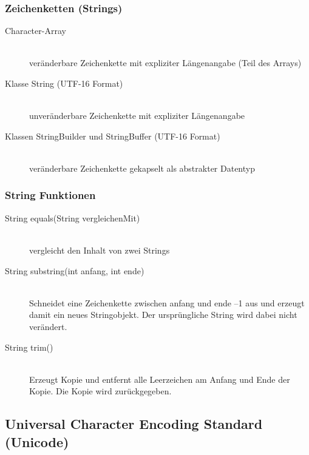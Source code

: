 \documentclass[a4paper,10pt]{article}
\begin{document}
\subsubsection{Zeichenketten (Strings)}
\begin{description}
	\item[Character-Array] \hfill \\
		ver\"anderbare Zeichenkette mit expliziter Längenangabe (Teil des Arrays)
	\item[Klasse String (UTF-16 Format)] \hfill \\
		unver\"anderbare Zeichenkette mit expliziter Längenangabe
	\item[Klassen StringBuilder und StringBuffer (UTF-16 Format)] \hfill \\
		ver\"anderbare Zeichenkette gekapselt als abstrakter Datentyp
\end{description}

\subsubsection{String Funktionen}
\begin{description}
	\item[String equals(String vergleichenMit)] \hfill \\
		vergleicht den Inhalt von zwei Strings
	\item[String substring(int anfang, int ende)] \hfill \\
		Schneidet eine Zeichenkette zwischen anfang und ende –1 aus und erzeugt damit ein neues Stringobjekt. Der ursprüngliche String wird dabei nicht verändert.
	\item[String trim()] \hfill \\
		Erzeugt Kopie und entfernt alle Leerzeichen am Anfang und Ende der Kopie. Die Kopie wird zurückgegeben.
\end{description}

\subsection{Universal Character Encoding Standard (Unicode)}
\end{document}

